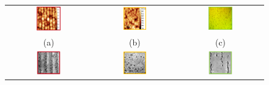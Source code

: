 \begin{figure}[H]
\begin{tabular}{ccc}
  \includegraphics[width=0.30\textwidth]{Bilder/TS4045/aELOafm.png} & \includegraphics[width=0.30\textwidth]{Bilder/TS4045/bELOafm.png}  & \includegraphics[width=0.30\textwidth]{Bilder/TS4045/cELOlimi.png} \\
(a) & (b) & (c) \\[6pt]
 \includegraphics[width=0.30\textwidth]{Bilder/TS4045/aELOcl2.png} &   \includegraphics[width=0.30\textwidth]{Bilder/TS4045/bELOcl2.png} & \includegraphics[width=0.30\textwidth]{Bilder/TS4045/cELOcl2.png}  \\

\end{tabular}
\end{figure}
